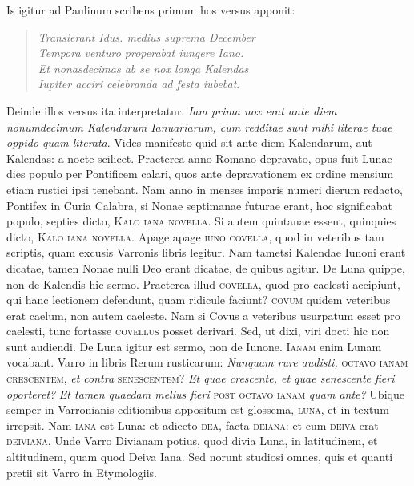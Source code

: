 Is igitur ad Paulinum scribens primum hos versus apponit:
\begin{verse}
\textit{Transierant Idus. medius suprema December\\
Tempora venturo properabat iungere Iano.\\
Et nonasdecimas ab se nox longa Kalendas\\
Iupiter acciri celebranda ad festa iubebat}.
\end{verse}
Deinde illos versus ita interpretatur.
\textit{Iam prima nox erat ante diem
nonumdecimum Kalendarum Ianuariarum, cum redditae sunt mihi literae
tuae oppido quam literata}.
Vides manifesto quid sit ante diem
Kalendarum, aut Kalendas: a nocte scilicet.
Praeterea anno Romano
depravato, opus fuit Lunae dies populo per Pontificem calari,
quos ante depravationem ex ordine mensium etiam rustici ipsi
tenebant.
Nam anno in menses imparis numeri dierum redacto,
Pontifex in Curia Calabra, si Nonae septimanae futurae erant, hoc
significabat populo, septies dicto, \textsc{Kalo iana novella}.
Si autem quintanae essent, quinquies dicto, \textsc{Kalo iana novella}.
Apage apage \textsc{iuno covella}, quod in veteribus tam scriptis,
quam excusis Varronis libris legitur.
Nam tametsi Kalendae Iunoni
erant dicatae, tamen Nonae nulli Deo erant dicatae, de quibus agitur.
De Luna quippe, non de Kalendis hic sermo.
Praeterea illud
\textsc{covella}, quod pro caelesti accipiunt, qui hanc lectionem defendunt,
quam ridicule faciunt?
\textsc{covum} quidem veteribus erat caelum,
non autem caeleste.
Nam si Covus a veteribus usurpatum
esset pro caelesti, tunc fortasse \textsc{covellus} posset derivari.
Sed, ut
dixi, viri docti hic non sunt audiendi.
De Luna igitur est sermo, non
de Iunone.
\textsc{Ianam} enim Lunam vocabant.
Varro in libris Rerum
rusticarum: \textit{Nunquam rure audisti,} \textsc{octavo ianam crescentem},
\textit{et contra} \textsc{senescentem}?
\textit{Et quae crescente, et quae
senescente fieri oporteret?}
\textit{Et tamen quaedam melius fieri} \textsc{post octavo
ianam} \textit{quam ante?}
Ubique semper in Varronianis editionibus
appositum est glossema, \textsc{luna}, et in textum irrepsit.
Nam \textsc{iana}
est Luna: et adiecto \textsc{dea}, facta \textsc{deiana}: et cum \textsc{deiva}
erat \textsc{deiviana}.
Unde Varro Divianam potius, quod divia Luna,
in latitudinem, et altitudinem, quam quod Deiva Iana.
Sed norunt
studiosi omnes, quis et quanti pretii sit Varro in Etymologiis.
